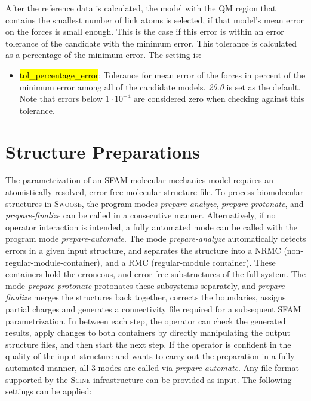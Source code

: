 \documentclass[]{tufte-book}
\begin{document}
{{After the reference data is calculated, the model with the QM region that contains the smallest number of link atoms is selected, if that model's mean error on the forces is small enough. This is the case if this error is within an error tolerance of the candidate with the minimum error. This tolerance is calculated as a percentage of the minimum error. The setting is:

\begin{itemize}
\item \hl{tol\_percentage\_error}: Tolerance for mean error of the forces in percent of the minimum error among all of the candidate models. \textit{20.0} is set as the default. Note that errors below $1\cdot 10^{-4}$ are considered zero when checking against this tolerance.
\end{itemize}

\chapter{Structure Preparations}\label{ch:struct_prep}

The parametrization of an SFAM molecular mechanics model requires an atomistically resolved, error-free molecular structure file. 
To process biomolecular structures in \textsc{Swoose}, the program modes \textit{prepare-analyze}, \textit{prepare-protonate}, and \textit{prepare-finalize} can  be called in a consecutive manner. Alternatively, if no operator interaction is intended, a fully automated mode can be called  with the program mode \textit{prepare-automate}. 
The mode \textit{prepare-analyze} automatically detects errors in a given input structure, and separates the structure into a NRMC (non-regular-module-container), and a RMC (regular-module container). These containers hold the erroneous, and error-free substructures of the full system.  
The mode \textit{prepare-protonate} protonates these subsystems separately, and \textit{prepare-finalize} merges the structures back together, corrects the boundaries, assigns partial charges and generates a connectivity file required for a subsequent SFAM parametrization. In between each step, the operator can check the generated results, apply changes to both containers by directly manipulating the output structure files, and then start the next step. If the operator is confident in the quality of the input structure and wants to carry out the preparation in a fully automated manner, all 3 modes are called via \textit{prepare-automate}. Any file format supported by the \textsc{Scine} infrastructure can be provided as input. The following settings can be applied:

}}
\end{document}
